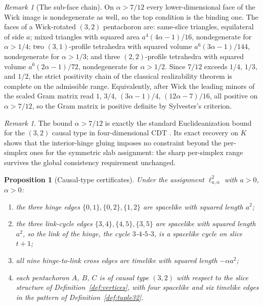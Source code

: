 \documentclass[11pt]{article}
\newtheorem{proposition}[theorem]{Proposition}
\theoremstyle{definition}
\theoremstyle{remark}
\newtheorem{remark}[theorem]{Remark}
\newcommand{\Kmin}{K}
\newcommand{\ltwo}{\ell^{2}_{a,\alpha}}
\begin{document}
\begin{remark}[The sub-face chain]
\label{rem:subfaces}
On $\alpha>7/12$ every lower-dimensional face of the Wick image is nondegenerate as well, so the top condition is the binding one. The faces of a Wick-rotated $(3,2)$ pentachoron are: same-slice triangles, equilateral of side $a$; mixed triangles with squared area $a^{4}(4\alpha-1)/16$, nondegenerate for $\alpha>1/4$; two $(3,1)$-profile tetrahedra with squared volume $a^{6}(3\alpha-1)/144$, nondegenerate for $\alpha>1/3$; and three $(2,2)$-profile tetrahedra with squared volume $a^{6}(2\alpha-1)/72$, nondegenerate for $\alpha>1/2$. Since $7/12$ exceeds $1/4$, $1/3$, and $1/2$, the strict positivity chain of the classical realizability theorem is complete on the admissible range. Equivalently, after Wick the leading minors of the scaled Gram matrix read $1$, $3/4$, $(3\alpha-1)/4$, $(12\alpha-7)/16$, all positive on $\alpha>7/12$, so the Gram matrix is positive definite by Sylvester's criterion.
\end{remark}

\begin{remark}
The bound $\alpha>7/12$ is exactly the standard Euclideanization bound for the $(3,2)$ causal type in four-dimensional CDT \cite{AJL}. Its exact recovery on $\Kmin$ shows that the interior-hinge gluing imposes no constraint beyond the per-simplex ones for the symmetric slab assignment: the sharp per-simplex range survives the global consistency requirement unchanged.
\end{remark}

\begin{proposition}[Causal-type certificates]
\label{prop:types}
Under the assignment $\ltwo$ with $a>0$, $\alpha>0$:
\begin{enumerate}
\item the three hinge edges $\{0,1\},\{0,2\},\{1,2\}$ are spacelike with squared length $a^{2}$;
\item the three link-cycle edges $\{3,4\},\{4,5\},\{3,5\}$ are spacelike with squared length $a^{2}$, so the link of the hinge, the cycle $3$-$4$-$5$-$3$, is a spacelike cycle on slice $t+1$;
\item all nine hinge-to-link cross edges are timelike with squared length $-\alpha a^{2}$;
\item each pentachoron $A$, $B$, $C$ is of causal type $(3,2)$ with respect to the slice structure of Definition~\ref{def:vertices}, with four spacelike and six timelike edges in the pattern of Definition~\ref{def:tuple32}.
\end{enumerate}
\end{proposition}
\end{document}
